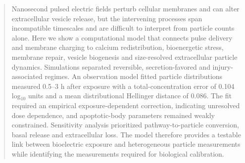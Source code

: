 \begin{abstract}
Nanosecond pulsed electric fields perturb cellular membranes and can alter extracellular vesicle release, but the intervening processes span incompatible timescales and are difficult to interpret from particle counts alone. Here we show a computational model that connects pulse delivery and membrane charging to calcium redistribution, bioenergetic stress, membrane repair, vesicle biogenesis and size-resolved extracellular particle dynamics. Simulations separated reversible, secretion-favored and injury-associated regimes. An observation model fitted particle distributions measured 0.5--3 h after exposure with a total-concentration error of 0.104 log$_{10}$ units and a mean distributional Hellinger distance of 0.086. The fit required an empirical exposure-dependent correction, indicating unresolved dose dependence, and apoptotic-body parameters remained weakly constrained. Sensitivity analysis prioritized pathway-to-particle conversion, basal release and extracellular loss. The model therefore provides a testable link between bioelectric exposure and heterogeneous particle measurements while identifying the measurements required for biological calibration.
\end{abstract}
